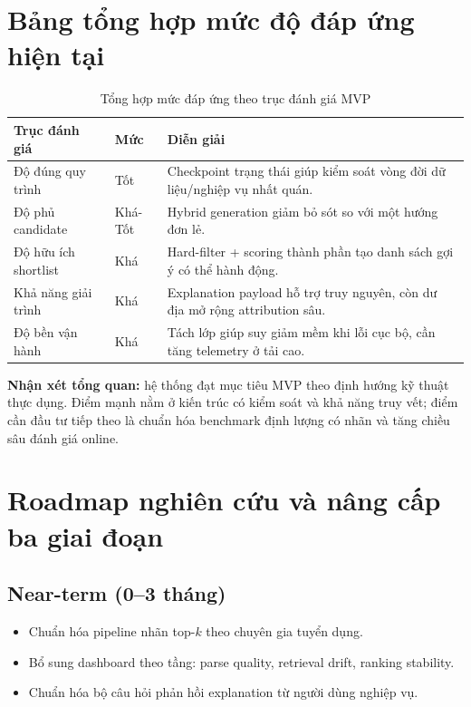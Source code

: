 \section{Bảng tổng hợp mức độ đáp ứng hiện tại}

\begin{table}[H]
\caption{Tổng hợp mức đáp ứng theo trục đánh giá MVP}
\centering
\begin{tabularx}{\textwidth}{p{}p{}X}
\toprule
\textbf{Trục đánh giá} & \textbf{Mức} & \textbf{Diễn giải}\
\\
\midrule
Độ đúng quy trình & Tốt & Checkpoint trạng thái giúp kiểm soát vòng đời dữ liệu/nghiệp vụ nhất quán.\\
Độ phủ candidate & Khá-Tốt & Hybrid generation giảm bỏ sót so với một hướng đơn lẻ.\\
Độ hữu ích shortlist & Khá & Hard-filter + scoring thành phần tạo danh sách gợi ý có thể hành động.\\
Khả năng giải trình & Khá & Explanation payload hỗ trợ truy nguyên, còn dư địa mở rộng attribution sâu.\\
Độ bền vận hành & Khá & Tách lớp giúp suy giảm mềm khi lỗi cục bộ, cần tăng telemetry ở tải cao.\\
\bottomrule
\end{tabularx}
\end{table}

\noindent
\textbf{Nhận xét tổng quan:} hệ thống đạt mục tiêu MVP theo định hướng kỹ thuật thực dụng. Điểm mạnh nằm ở kiến trúc có kiểm soát và khả năng truy vết; điểm cần đầu tư tiếp theo là chuẩn hóa benchmark định lượng có nhãn và tăng chiều sâu đánh giá online.

\section{Roadmap nghiên cứu và nâng cấp ba giai đoạn}

\subsection{Near-term (0--3 tháng)}

\begin{itemize}
  \item Chuẩn hóa pipeline nhãn top-$k$ theo chuyên gia tuyển dụng.
  \item Bổ sung dashboard theo tầng: parse quality, retrieval drift, ranking stability.
  \item Chuẩn hóa bộ câu hỏi phản hồi explanation từ người dùng nghiệp vụ.
\end{itemize}

